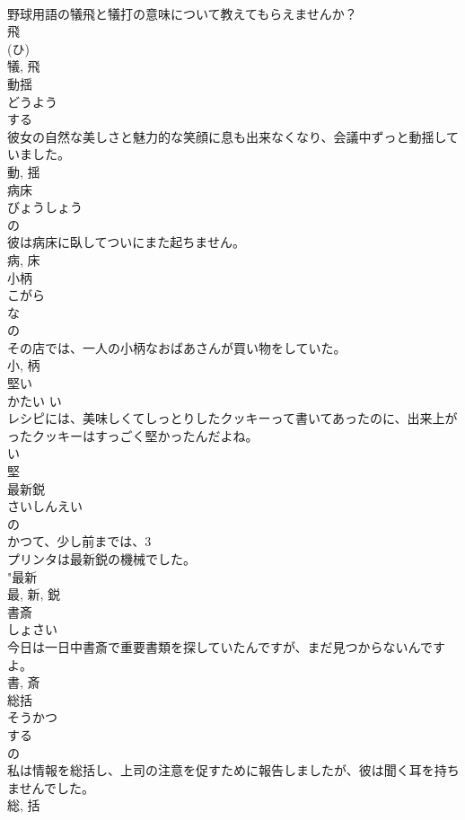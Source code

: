 \documentclass[8pt]{extreport}
\begin{document}
\begin{CJK}{UTF8}{min}
\\	野球用語の犠飛と犠打の意味について教えてもらえませんか？	
\\	飛 
\\	(ひ) 
\\	犠, 飛	
\\	動揺	
\\	どうよう	
\\	する 
\\	彼女の自然な美しさと魅力的な笑顔に息も出来なくなり、会議中ずっと動揺していました。	
\\	動, 揺	
\\	病床	
\\	びょうしょう	
\\	の 
\\	彼は病床に臥してついにまた起ちません。	
\\	病, 床	
\\	小柄	
\\	こがら	
\\	な 
\\	の 
\\	その店では、一人の小柄なおばあさんが買い物をしていた。	
\\	小, 柄	
\\	堅い	
\\	かたい	い 
\\	レシピには、美味しくてしっとりしたクッキーって書いてあったのに、出来上がったクッキーはすっごく堅かったんだよね。	
\\	い 
\\	堅	
\\	最新鋭	
\\	さいしんえい	
\\	の 
\\	かつて、少し前までは、3
\\	プリンタは最新鋭の機械でした。	
\\	"最新 
\\	最, 新, 鋭	
\\	書斎	
\\	しょさい	
\\	今日は一日中書斎で重要書類を探していたんですが、まだ見つからないんですよ。	
\\	書, 斎	
\\	総括	
\\	そうかつ	
\\	する 
\\	の 
\\	私は情報を総括し、上司の注意を促すために報告しましたが、彼は聞く耳を持ちませんでした。	
\\	総, 括	

\end{CJK}
\end{document}

